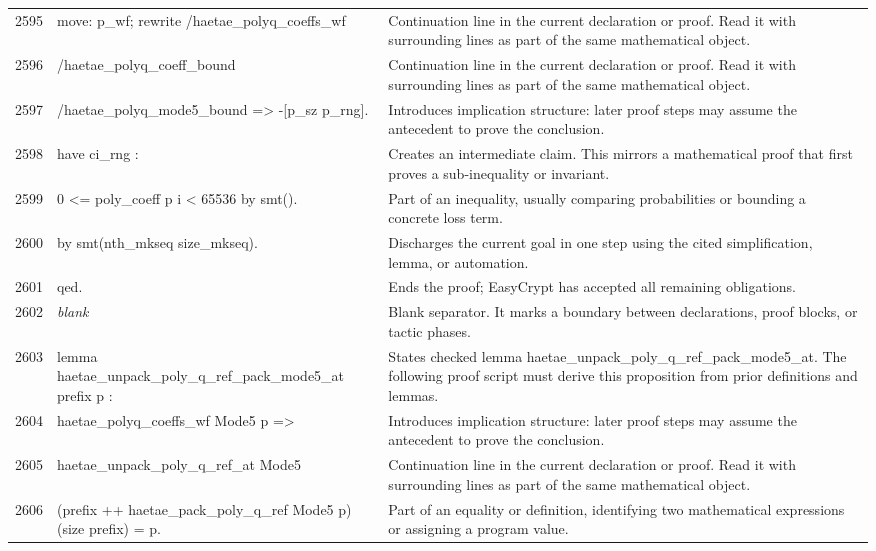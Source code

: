 \documentclass[10pt]{article}
\begin{document}
\begin{longtable}{r L{0.53\textwidth} L{0.37\textwidth}}
2595 & {\ttfamily\scriptsize move: p\_wf; rewrite /haetae\_polyq\_coeffs\_wf} & Continuation line in the current declaration or proof.  Read it with surrounding lines as part of the same mathematical object. \\
2596 & {\ttfamily\scriptsize                   /haetae\_polyq\_coeff\_bound} & Continuation line in the current declaration or proof.  Read it with surrounding lines as part of the same mathematical object. \\
2597 & {\ttfamily\scriptsize                   /haetae\_polyq\_mode5\_bound => -[p\_sz p\_rng].} & Introduces implication structure: later proof steps may assume the antecedent to prove the conclusion. \\
2598 & {\ttfamily\scriptsize have ci\_rng :} & Creates an intermediate claim.  This mirrors a mathematical proof that first proves a sub-inequality or invariant. \\
2599 & {\ttfamily\scriptsize   0 <= poly\_coeff p i < 65536 by smt().} & Part of an inequality, usually comparing probabilities or bounding a concrete loss term. \\
2600 & {\ttfamily\scriptsize by smt(nth\_mkseq size\_mkseq).} & Discharges the current goal in one step using the cited simplification, lemma, or automation. \\
2601 & {\ttfamily\scriptsize qed.} & Ends the proof; EasyCrypt has accepted all remaining obligations. \\
2602 & {\ttfamily\scriptsize \emph{blank}} & Blank separator.  It marks a boundary between declarations, proof blocks, or tactic phases. \\
2603 & {\ttfamily\scriptsize lemma haetae\_unpack\_poly\_q\_ref\_pack\_mode5\_at prefix p :} & States checked lemma haetae\_unpack\_poly\_q\_ref\_pack\_mode5\_at.  The following proof script must derive this proposition from prior definitions and lemmas. \\
2604 & {\ttfamily\scriptsize   haetae\_polyq\_coeffs\_wf Mode5 p =>} & Introduces implication structure: later proof steps may assume the antecedent to prove the conclusion. \\
2605 & {\ttfamily\scriptsize   haetae\_unpack\_poly\_q\_ref\_at Mode5} & Continuation line in the current declaration or proof.  Read it with surrounding lines as part of the same mathematical object. \\
2606 & {\ttfamily\scriptsize     (prefix ++ haetae\_pack\_poly\_q\_ref Mode5 p) (size prefix) = p.} & Part of an equality or definition, identifying two mathematical expressions or assigning a program value. \\

\end{longtable}
\end{document}
